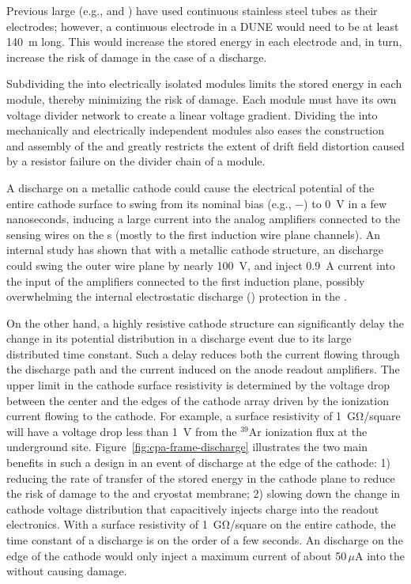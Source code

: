 Previous large  (e.g.,  and ) have used continuous stainless steel tubes as their  electrodes;
however, a continuous electrode in a DUNE  would need to be at least \SI{140}{\m} long. This would increase the stored energy in each electrode and, in turn, increase the risk of damage in the case of a discharge. 

Subdividing the  into electrically isolated modules limits the stored energy in each  module, thereby minimizing the risk of damage. Each  module must have its own voltage divider network to create a linear voltage gradient. Dividing the  into mechanically and electrically independent modules also eases the construction and assembly of the  and greatly restricts the extent of drift field distortion caused by a resistor failure on the divider chain of a  module.

A  discharge on a metallic cathode could cause the electrical potential of the entire cathode surface to swing from its nominal bias (e.g., $-$\sptargetdriftvoltpos) to \SI{0}{V} in a few nanoseconds, inducing a large current into the analog  amplifiers connected to the sensing wires on the s (mostly to the first induction wire plane channels). 
An internal study\cite{bib:docdb1320} has shown that with a metallic cathode structure, an  discharge could swing the outer wire plane by nearly \SI{100}{V}, and inject \SI{0.9}{A} current into the input of the  amplifiers connected to the first induction plane, possibly overwhelming the internal electrostatic discharge () protection in the  .  


On the other hand, a highly resistive cathode structure can significantly delay the change in its potential distribution in a discharge event due to its large distributed  time constant. Such a delay reduces both the current flowing through the discharge path and the current induced on the anode readout amplifiers.  The upper limit in the cathode surface resistivity is 
determined by the voltage drop between the center and the edges of the cathode array driven by the ionization current flowing to the cathode.  For example, a surface resistivity of \SI{1}{\giga\ohm}/square  will have a voltage drop less than \SI{1}{V} from the $^{39}$Ar ionization flux at the underground site. Figure~\ref{fig:cpa-frame-discharge} illustrates the two main 
benefits in such a design in an event of  discharge at the edge of the cathode: 1) reducing the rate of transfer of the stored energy in the cathode plane to reduce the risk of damage to the  and cryostat membrane; 2) slowing down the change in cathode voltage distribution that capacitively injects charge into the readout electronics.
With a surface resistivity of \SI{1}{\giga\ohm}/square on the entire cathode, the time constant of a discharge is on the order of a few seconds. An  discharge on the edge of the cathode would only inject a maximum current of about 50\,$\mu$A into the   without causing damage.



